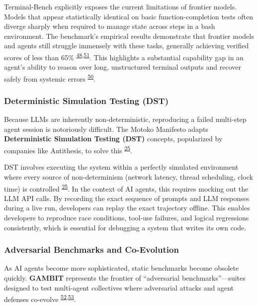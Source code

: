 \documentclass[
  11pt,
]{article}
\begin{document}
Terminal-Bench explicitly exposes the current limitations of frontier
models. Models that appear statistically identical on basic
function-completion tests often diverge sharply when required to manage
state across steps in a bash environment. The benchmark's empirical
results demonstrate that frontier models and agents still struggle
immensely with these tasks, generally achieving verified scores of less
than 65\%
\textsuperscript{\protect\hyperlink{cite-48}{48},\protect\hyperlink{cite-51}{51}}.
This highlights a substantial capability gap in an agent's ability to
reason over long, unstructured terminal outputs and recover safely from
systemic errors \textsuperscript{\protect\hyperlink{cite-50}{50}}.

\hypertarget{deterministic-simulation-testing-dst}{%
\subsubsection{Deterministic Simulation Testing
(DST)}\label{deterministic-simulation-testing-dst}}

Because LLMs are inherently non-deterministic, reproducing a failed
multi-step agent session is notoriously difficult. The Motoko Manifesto
adapts \textbf{Deterministic Simulation Testing (DST)} concepts,
popularized by companies like Antithesis, to solve this
\textsuperscript{\protect\hyperlink{cite-25}{25}}.

DST involves executing the system within a perfectly simulated
environment where every source of non-determinism (network latency,
thread scheduling, clock time) is controlled
\textsuperscript{\protect\hyperlink{cite-25}{25}}. In the context of AI
agents, this requires mocking out the LLM API calls. By recording the
exact sequence of prompts and LLM responses during a live run,
developers can replay the exact trajectory offline. This enables
developers to reproduce race conditions, tool-use failures, and logical
regressions consistently, which is essential for debugging a system that
writes its own code.

\hypertarget{adversarial-benchmarks-and-co-evolution}{%
\subsubsection{Adversarial Benchmarks and
Co-Evolution}\label{adversarial-benchmarks-and-co-evolution}}

As AI agents become more sophisticated, static benchmarks become
obsolete quickly. \textbf{GAMBIT} represents the frontier of
``adversarial benchmarks''---suites designed to test multi-agent
collectives where adversarial attacks and agent defenses co-evolve
\textsuperscript{\protect\hyperlink{cite-52}{52},\protect\hyperlink{cite-53}{53}}.
\end{document}
